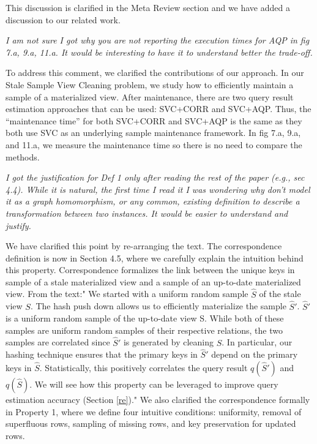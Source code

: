This discussion is clarified in the Meta Review section and we have added a discussion to our related work.

\vspace{1em}
\emph{I am not sure I got why you are not reporting the execution times for AQP in fig 7.a, 9.a, 11.a. It would be interesting to have it to understand better the trade-off.}

To address this comment, we clarified the contributions of our approach. In our Stale Sample View Cleaning problem, we study how to efficiently maintain a sample of a materialized view. After maintenance, there are two query result estimation approaches that can be used: SVC+CORR and SVC+AQP. Thus, the “maintenance time” for both SVC+CORR and SVC+AQP is the same as they both use SVC as an underlying sample maintenance framework.  In fig 7.a, 9.a, and 11.a, we measure the maintenance time so there is no need to compare the methods. 

\vspace{1em}
\emph{I got the justification for Def 1 only after reading the rest of the paper (e.g., sec 4.4). While it is natural, the first time I read it I was wondering why don't model it as a graph homomorphism, or any common, existing definition to describe a transformation between two instances. It would be easier to understand and justify.}

We have clarified this point by re-arranging the text. The correspondence definition is now in Section 4.5, where we carefully explain the intuition behind this property. Correspondence formalizes the link between the unique keys in sample of a stale materialized view and a sample of an up-to-date materialized view. From the text:" 
We started with a uniform random sample $\widehat{S}$ of the stale view $S$. The hash push down allows us to efficiently materialize the sample $\widehat{S}'$. $\widehat{S}'$ is a uniform random sample of the up-to-date view S. While both of these samples are uniform random samples of their respective relations, the two samples are correlated since $\widehat{S}'$ is generated by cleaning $\widehat{S}$. In particular, our hashing technique ensures that the primary keys in $\widehat{S}'$ depend on the primary keys in $\widehat{S}$. Statistically, this positively correlates the query result $q(\widehat{S}')$ and $q(\widehat{S})$. We will see how this property can be leveraged to improve query estimation accuracy (Section \ref{re})."
We also clarified the correspondence formally in Property 1, where we define four intuitive conditions: uniformity, removal of superfluous rows, sampling of missing rows, and key preservation for updated rows.

